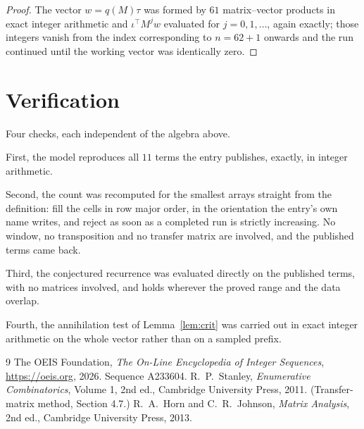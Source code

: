 \documentclass[11pt,a4paper]{article}
\theoremstyle{plain}
\theoremstyle{definition}
\begin{document}
\begin{proof}
The vector $w=q(M)\tau$ was formed by $61$ matrix--vector products in exact integer
arithmetic and $\iota^{\!\top}M^{j}w$ evaluated for $j=0,1,\dots$, again exactly; those
integers vanish from the index corresponding to $n=62+1$ onwards and the run continued
until the working vector was identically zero.
\end{proof}

\section{Verification}

Four checks, each independent of the algebra above.

First, the model reproduces all $11$ terms the entry publishes, exactly, in integer
arithmetic.

Second, the count was recomputed for the smallest arrays straight from the definition: fill the
cells in row major order, in the orientation the entry's own name writes, and reject as soon as
a completed run is strictly increasing. No window, no transposition and no transfer matrix are involved, and
the published terms came back.

Third, the conjectured recurrence was evaluated directly on the published terms, with no
matrices involved, and holds wherever the proved range and the data overlap.

Fourth, the annihilation test of Lemma~\ref{lem:crit} was carried out in exact integer
arithmetic on the whole vector rather than on a sampled prefix.

\begin{thebibliography}{9}
 The OEIS Foundation, \emph{The On-Line Encyclopedia of Integer
Sequences}, \url{https://oeis.org}, 2026. Sequence A233604.
 R.~P.~Stanley, \emph{Enumerative Combinatorics}, Volume 1, 2nd ed.,
Cambridge University Press, 2011. (Transfer-matrix method, Section 4.7.)
 R.~A.~Horn and C.~R.~Johnson, \emph{Matrix Analysis}, 2nd ed., Cambridge
University Press, 2013.
\end{thebibliography}
\end{document}
